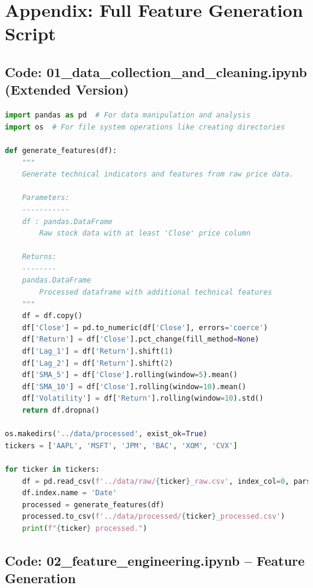 \documentclass[12pt]{article}
\begin{document}
\clearpage
\section*{Appendix: Full Feature Generation Script}

\subsection*{Code: 01\_data\_collection\_and\_cleaning.ipynb (Extended Version)}

\begin{lstlisting}[language=Python]
import pandas as pd  # For data manipulation and analysis
import os  # For file system operations like creating directories

def generate_features(df):
    """
    Generate technical indicators and features from raw price data.
    
    Parameters:
    -----------
    df : pandas.DataFrame
        Raw stock data with at least 'Close' price column
        
    Returns:
    --------
    pandas.DataFrame
        Processed dataframe with additional technical features
    """
    df = df.copy()
    df['Close'] = pd.to_numeric(df['Close'], errors='coerce')
    df['Return'] = df['Close'].pct_change(fill_method=None)
    df['Lag_1'] = df['Return'].shift(1)
    df['Lag_2'] = df['Return'].shift(2)
    df['SMA_5'] = df['Close'].rolling(window=5).mean()
    df['SMA_10'] = df['Close'].rolling(window=10).mean()
    df['Volatility'] = df['Return'].rolling(window=10).std()
    return df.dropna()

os.makedirs('../data/processed', exist_ok=True)
tickers = ['AAPL', 'MSFT', 'JPM', 'BAC', 'XOM', 'CVX']

for ticker in tickers:
    df = pd.read_csv(f'../data/raw/{ticker}_raw.csv', index_col=0, parse_dates=True)
    df.index.name = 'Date'
    processed = generate_features(df)
    processed.to_csv(f'../data/processed/{ticker}_processed.csv')
    print(f"{ticker} processed.")
\end{lstlisting}

\clearpage
\subsection*{Code: 02\_feature\_engineering.ipynb – Feature Generation}
\end{document}
